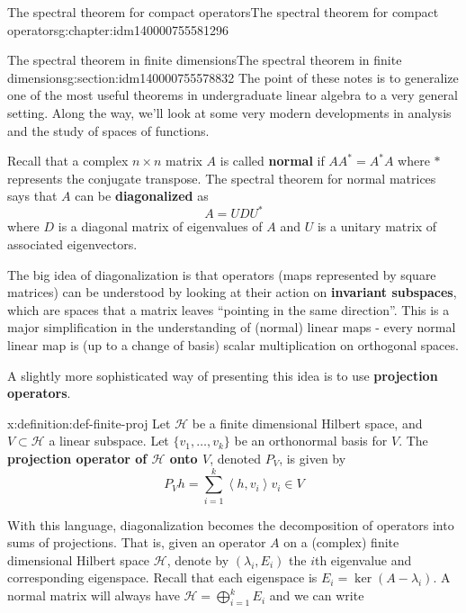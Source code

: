 \documentclass[oneside,10pt,]{book}
\newcommand{\terminology}[1]{\textbf{#1}}
\numberwithin{equation}{section}
\newcommand{\hilbert}{\mathcal{H}}
\newcommand{\ip}[2]{\left\langle #1, #2 \right\rangle}
\newcommand{\ad}{^\ast}
\newcommand\la{\lambda}
\numberwithin{equation}{section}
\begin{document}
\begin{chapterptx}{The spectral theorem for compact operators}{}{The spectral theorem for compact operators}{}{}{g:chapter:idm140000755581296}
%
%
\typeout{************************************************}
\typeout{************************************************}
%
\begin{sectionptx}{The spectral theorem in finite dimensions}{}{The spectral theorem in finite dimensions}{}{}{g:section:idm140000755578832}
The point of these notes is to generalize one of the most useful theorems in undergraduate linear algebra to a very general setting. Along the way, we'll look at some very modern developments in analysis and the study of spaces of functions.%
\par
Recall that a complex \(n \times n\) matrix \(A\) is called \terminology{normal} if \(A A\ad = A\ad A\) where \(\ast\) represents the conjugate transpose. The spectral theorem for normal matrices says that \(A\) can be \terminology{diagonalized} as%
\begin{equation*}
A = U D U\ad
\end{equation*}
where \(D\) is a diagonal matrix of eigenvalues of \(A\) and \(U\) is a unitary matrix of associated eigenvectors.%
\par
The big idea of diagonalization is that operators (maps represented by square matrices) can be understood by looking at their action on \terminology{invariant subspaces}, which are spaces that a matrix leaves ``pointing in the same direction''. This is a major simplification in the understanding of (normal) linear maps - every normal linear map is (up to a change of basis) scalar multiplication on orthogonal spaces.%
\par
A slightly more sophisticated way of presenting this idea is to use \terminology{projection operators}.%
\begin{definition}{}{x:definition:def-finite-proj}%
Let \(\hilbert\) be a finite dimensional Hilbert space, and \(V \subset \hilbert\) a linear subspace. Let \(\{v_1, \ldots, v_k\}\) be an orthonormal basis for \(V\). The \terminology{projection operator of \(\hilbert\) onto \(V\)}, denoted \(P_V\), is given by%
\begin{equation*}
P_V h = \sum_{i=1}^k \ip{h}{v_i} v_i \in V
\end{equation*}
%
\end{definition}
With this language, diagonalization becomes the decomposition of operators into sums of projections. That is, given an operator \(A\) on a (complex) finite dimensional Hilbert space \(\hilbert\), denote by \((\la_i, E_i)\) the \(i\)th eigenvalue and corresponding eigenspace. Recall that each eigenspace is \(E_i = \ker(A - \la_i)\). A normal matrix will always have \(\hilbert = \bigoplus_{i=1}^k E_i\) and we can write%

\end{sectionptx}
\end{chapterptx}
\end{document}
